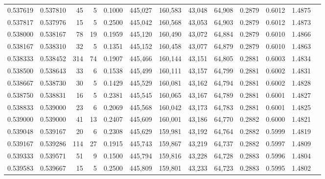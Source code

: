 \begin{tabular}{rrrrrrrrrrrrr}
0.537619 & 0.537810 &    45 &   5 &                                     0.1000 & 445,027 & 160,583 &  43,048 &  64,908 & 0.2879 & 0.6012 & 1.4875 \\
0.537817 & 0.537976 &    15 &   5 &                                     0.2500 & 445,042 & 160,568 &  43,053 &  64,903 & 0.2879 & 0.6012 & 1.4873 \\
0.538000 & 0.538167 &    78 &  19 &                                     0.1959 & 445,120 & 160,490 &  43,072 &  64,884 & 0.2879 & 0.6010 & 1.4866 \\
0.538167 & 0.538310 &    32 &   5 &                                     0.1351 & 445,152 & 160,458 &  43,077 &  64,879 & 0.2879 & 0.6010 & 1.4863 \\
0.538333 & 0.538452 &   314 &  74 &                                     0.1907 & 445,466 & 160,144 &  43,151 &  64,805 & 0.2881 & 0.6003 & 1.4834 \\
0.538500 & 0.538643 &    33 &   6 &                                     0.1538 & 445,499 & 160,111 &  43,157 &  64,799 & 0.2881 & 0.6002 & 1.4831 \\
0.538667 & 0.538730 &    30 &   5 &                                     0.1429 & 445,529 & 160,081 &  43,162 &  64,794 & 0.2881 & 0.6002 & 1.4828 \\
0.538750 & 0.538831 &    16 &   5 &                                     0.2381 & 445,545 & 160,065 &  43,167 &  64,789 & 0.2881 & 0.6001 & 1.4827 \\
0.538833 & 0.539000 &    23 &   6 &                                     0.2069 & 445,568 & 160,042 &  43,173 &  64,783 & 0.2881 & 0.6001 & 1.4825 \\
0.539000 & 0.539000 &    41 &  13 &                                     0.2407 & 445,609 & 160,001 &  43,186 &  64,770 & 0.2882 & 0.6000 & 1.4821 \\
0.539048 & 0.539167 &    20 &   6 &                                     0.2308 & 445,629 & 159,981 &  43,192 &  64,764 & 0.2882 & 0.5999 & 1.4819 \\
0.539167 & 0.539286 &   114 &  27 &                                     0.1915 & 445,743 & 159,867 &  43,219 &  64,737 & 0.2882 & 0.5997 & 1.4809 \\
0.539333 & 0.539571 &    51 &   9 &                                     0.1500 & 445,794 & 159,816 &  43,228 &  64,728 & 0.2883 & 0.5996 & 1.4804 \\
0.539583 & 0.539667 &    15 &   5 &                                     0.2500 & 445,809 & 159,801 &  43,233 &  64,723 & 0.2883 & 0.5995 & 1.4802 \\

\end{tabular}
